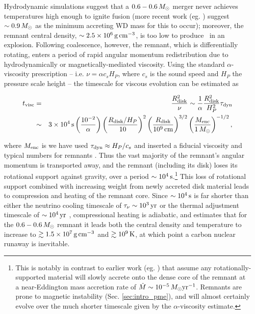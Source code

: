 
Hydrodynamic simulations \citep{loreig09} suggest that a $0.6-0.6\,\Msun$ merger never achieves temperatures high enough to ignite fusion (more recent work (eg. \citep{pakm+11, dan+12}) suggest $\sim0.9\,\Msun$ as the minimum accreting WD mass for this to occur); moreover, the remnant central density, $\sim2.5\times10^6\,\gcc$, is too low to produce \Ni\ in an explosion.  Following coalescence, however, the remnant, which is differentially rotating, enters a period of rapid angular momentum redistribution due to hydrodynamically or magnetically-mediated viscosity.  Using the standard $\alpha$-viscosity prescription \cite{shaks73} -- i.e. $\nu = \alpha c_s H_P$, where $c_s$ is the sound speed and $H_P$ the pressure scale height -- the timescale for viscous evolution can be estimated as

\begin{eqnarray}
t_\mrm{visc} &=& \frac{R_\mrm{disk}^2}{\nu} \sim \frac{1}{\alpha}\frac{R_\mrm{disk}^2}{H_P^2}\taudyn \nonumber \\
			&\sim& 3\times10^4\,\mrm{s}\left(\frac{10^{-2}}{\alpha}\right)\left(\frac{R_\mrm{disk}/H_P}{10}\right)^2\left(\frac{R_\mrm{disk}}{10^9\,\mrm{cm}}\right)^{3/2}\left(\frac{M_\mrm{enc}}{1\,\Msun}\right)^{-1/2},
\end{eqnarray}

\noindent where $M_\mathrm{enc}$ is we have used $\taudyn \approx H_P/c_s$ and inserted a fiducial viscosity and typical numbers for remnants \citep{shen+12}.  Thus the vast majority of the remnant's angular momentum is transported away, and the remnant (including its disk) loses its rotational support against gravity, over a period $\sim10^4\,\mathrm{s}$.\footnote{This is notably in contrast to earlier work (eg. \citep{nomoi85, yoonpr07}) that assume any rotationally-supported material will slowly accrete onto the dense core of the remnant at a near-Eddington mass accretion rate of $\dot{M} \sim 10^{-5}\,\Msun\pyr$.  Remnants are prone to magnetic instability (Sec. \ref{sec:intro_pme}), and will almost certainly evolve over the much shorter timescale given by the $\alpha$-viscosity estimate.}  This loss of rotational support combined with increasing weight from newly accreted disk material leads to compression and heating of the remnant core.  Since $\sim10^4\,\mathrm{s}$ is far shorter than either the neutrino cooling timescale of $\taunu \sim 10^3\,\mrm{yr}$ or the thermal adjustment timescale of $\sim10^4\,\mathrm{yr}$ \citep{shen+12}, compressional heating is adiabatic, and \citeal{vkercj10} estimates that for the $0.6-0.6\,\Msun$ remnant it leads both the central density and temperature to increase to $\gtrsim1.5\times10^7\,\gcc$ and $\gtrsim10^9\,\mathrm{K}$, at which point a carbon nuclear runaway is inevitable.

